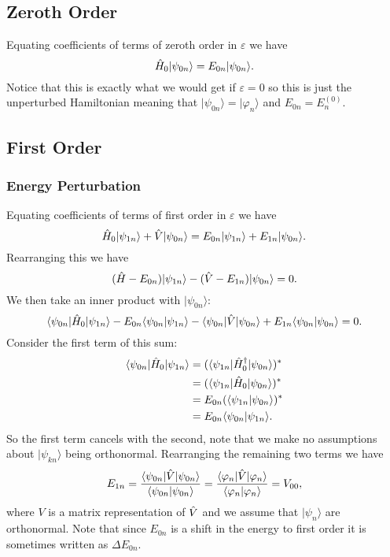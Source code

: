 \documentclass[a4paper]{article}
\renewcommand{\ket}[1]{\vert {#1} \rangle}
\renewcommand{\bra}[1]{\langle {#1} \vert}
\renewcommand{\braket}[2]{\langle {#1} \vert {#2} \rangle}
\theoremstyle{definition}
\begin{document}
    \subsection{Zeroth Order}
    Equating coefficients of terms of zeroth order in \(\varepsilon\) we have
    \[\operator{H}_0\ket{\psi_{0n}} = E_{0n}\ket{\psi_{0n}}.\]
    Notice that this is exactly what we would get if \(\varepsilon = 0\) so this is just the unperturbed Hamiltonian meaning that \(\ket{\psi_{0n}} = \ket{\varphi_n}\) and \(E_{0n} = E_n^{(0)}\).
    
    \subsection{First Order}
    \subsubsection{Energy Perturbation}
    Equating coefficients of terms of first order in \(\varepsilon\) we have
    \[\operator{H}_0\ket{\psi_{1n}} + \operator{V}\ket{\psi_{0n}} = E_{0n}\ket{\psi_{1n}} + E_{1n}\ket{\psi_{0n}}.\]
    Rearranging this we have
    \begin{equation}\label{eqn:perturbation theory first order terms}
        (\operator{H} - E_{0n})\ket{\psi_{1n}} - (\operator{V} - E_{1n})\ket{\psi_{0n}} = 0.
    \end{equation}
    We then take an inner product with \(\ket{\psi_{0n}}\):
    \[\bra{\psi_{0n}}\operator{H}_0\ket{\psi_{1n}} - E_{0n}\braket{\psi_{0n}}{\psi_{1n}} - \bra{\psi_{0n}}\operator{V}\ket{\psi_{0n}} + E_{1n}\braket{\psi_{0n}}{\psi_{0n}} = 0.\]
    Consider the first term of this sum:
    \begin{align*}
        \bra{\psi_{0n}}\operator{H}_0\ket{\psi_{1n}} &= (\bra{\psi_{1n}}\operator{H}_0\hermit\ket{\psi_{0n}})^*\\
        &= (\bra{\psi_{1n}}\operator{H}_0\ket{\psi_{0n}})^*\\
        &= E_{0n}(\braket{\psi_{1n}}{\psi_{0n}})^*\\
        &= E_{0n}\braket{\psi_{0n}}{\psi_{1n}}.
    \end{align*}
    So the first term cancels with the second, note that we make no assumptions about \(\ket{\psi_{kn}}\) being orthonormal.
    Rearranging the remaining two terms we have
    \[E_{1n} = \frac{\bra{\psi_{0n}}\operator{V}\ket{\psi_{0n}}}{\braket{\psi_{0n}}{\psi_{0n}}} = \frac{\bra{\varphi_n}\operator{V}\ket{\varphi_n}}{\braket{\varphi_n}{\varphi_n}} = V_{00},\]
    where \(V\) is a matrix representation of \(\hat{V}\) and we assume that \(\ket{\psi_n}\) are orthonormal.
    Note that since \(E_{0n}\) is a shift in the energy to first order it is sometimes written as \(\Delta E_{0n}\).
    
\end{document}
